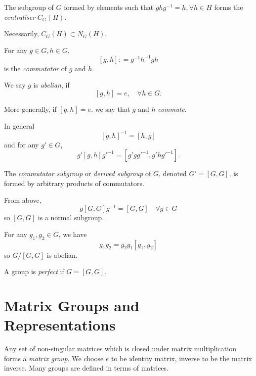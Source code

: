 \documentclass[a4paper,11pt]{article}
\begin{document}
	\begin{defi}
		The subgroup of $G$ formed by elements such that $g h g^{-1} = h, \forall h \in H$ forms the \emph{centraliser} $C_G(H)$.
	\end{defi}

	\begin{cor}
		Necessarily, $C_G(H) \subset N_G(H)$.
	\end{cor}

	\begin{defi}
		For any $g \in G, h \in G$, 
		\[
			[g,h] : = g^{-1} h^{-1} g h
		\]
		is the \emph{commutator} of $g$ and $h$. 
		
		We say $g$ is \emph{abelian}, if
		\[
			[g,h] = e, \quad \forall h\in G.
		\]

		More generally, if $[g,h] = e$, we say that $g$ and $h$ \emph{commute}.
	\end{defi}

	\begin{cor}
		In general
		\[
			[g,h]^{-1} = [h,g]
		\]
		and for any $g' \in G$,
		\[
			g' [g,h] g'^{-1} = [g' g g'^{-1}, g' h g'^{-1}].
		\]
	\end{cor}

	\begin{defi}
		The \emph{commutator subgroup} or \emph{derived subgroup} of $G$, denoted $G' = [G,G]$, is formed by arbitrary products of commutators.
	\end{defi}

	\begin{cor}
		From above,
		\[
			g[G,G]g^{-1} = [G,G] \quad \forall g \in G
		\]
		so $[G,G]$ is a normal subgroup.
	\end{cor}

	\begin{cor}
		For any $g_1, g_2 \in G$, we have
		\[
			g_1 g_2 = g_2 g_1 [g_1, g_2]
		\]
		so $G/ [G,G]$ is abelian.
	\end{cor}

	\begin{defi}
		A group is \emph{perfect} if $G = [G,G]$.
	\end{defi}

	\newpage

	\section{Matrix Groups and Representations}

	Any set of non-singular matrices which is closed under matrix multiplication forms a \emph{matrix group}. We choose $e$ to be identity matrix, inverse to be the matrix inverse. Many groups are defined in terms of matrices.
\end{document}
